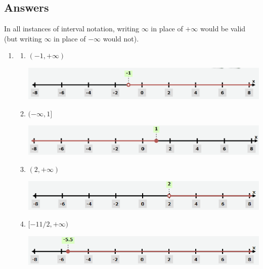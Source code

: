\newpage
\subsection{Answers}

In all instances of interval notation, writing $\infty$ in place of $+\infty$ would be valid (but writing $\infty$ in place of $-\infty$ would not).

\begin{enumerate}
\item \begin{enumerate}
\item $(-1, +\infty)$
\begin{center}
\includegraphics[scale=0.5]{lin-ineq-ans-1a.png}
\end{center}
\item $(-\infty, 1]$
\begin{center}
\includegraphics[scale=0.5]{lin-ineq-ans-1b.png}
\end{center}
\item $(2, +\infty)$
\begin{center}
\includegraphics[scale=0.5]{lin-ineq-ans-1c.png}
\end{center}
\item $[-11/2, +\infty)$
\begin{center}
\includegraphics[scale=0.5]{lin-ineq-ans-1d.png}
\end{center}
\end{enumerate}
\end{enumerate}